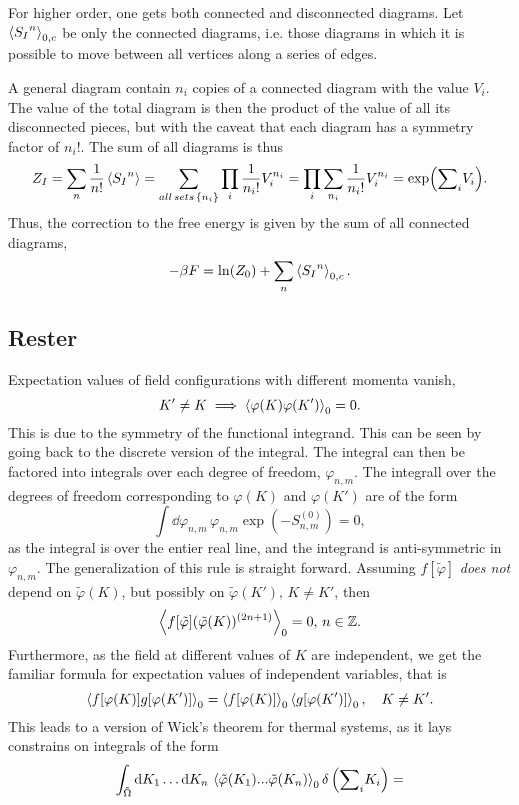 For higher order, one gets both connected and disconnected diagrams.
Let $\ex{{S_I}^n}_{0, c}$ be only the connected diagrams, i.e. those diagrams in which it is possible to move between all vertices along a series of edges.

A general diagram contain $n_i$ copies of a connected diagram with the value $V_i$.
The value of the total diagram is then the product of the value of all its disconnected pieces, but with the caveat that each diagram has a symmetry factor of $n_i!$.
The sum of all diagrams is thus 
\begin{equation}
    Z_I = \sum_n \frac{1}{n!} \ex{{S_I}^n} 
    = \sum_{ all\,sets\,\{n_i\}} \prod_i \frac{1}{n_i!}V_i^{n_i}
    = \prod_i \sum_{n_i} \frac{1}{n_i!}V_i^{n_i} = \exp({\sum}_i V_i).
\end{equation}
Thus, the correction to the free energy is given by the sum of all connected diagrams,
\begin{equation}
    - \beta F = \ln(Z_0) + \sum_n \ex{{S_I}^n}_{0, c}.
\end{equation}

\subsection*{Rester}


Expectation values of field configurations with different momenta vanish,
\begin{equation}
    K' \neq K \implies \ex{\varphi(K) \varphi(K')}_0 = 0.
\end{equation}
This is due to the symmetry of the functional integrand.
This can be seen by going back to the discrete version of the integral.
The integral can then be factored into integrals over each degree of freedom, $\varphi_{n,m}$.
The integrall over the degrees of freedom corresponding to $\varphi(K)$ and $\varphi(K')$ are of the form
\begin{equation}
    \int \dd \varphi_{n, m} \, \varphi_{n, m} \exp(- S^{(0)}_{n, m}) = 0,
\end{equation}
as the integral is over the entier real line, and the integrand is anti-symmetric in $\varphi_{n, m}$.
The generalization of this rule is straight forward. 
Assuming $f[\tilde \varphi]$ \emph{does not} depend on $\tilde \varphi(K)$, but possibly on $\tilde \varphi(K'), \, K \neq K'$, then
\begin{equation}
    \ex{f[\tilde \varphi](\tilde \varphi(K))^{(2n+1)}}_0 = 0, \, n \in \mathbb{Z}.
\end{equation}
Furthermore, as the field at different values of $K$ are independent, we get the familiar formula for expectation values of independent variables, that is
\begin{equation}
    \ex{f[\varphi(K)]g[\varphi(K')]}_0 = \ex{f[\varphi(K)]}_0 \ex{g[\varphi(K')]}_0, \quad
    K \neq K'.
\end{equation}
This leads to a version of Wick's theorem for thermal systems, as it lays constrains on integrals of the form
\begin{equation}
    \int_{\tilde \Omega} \dd K_1 \dots \dd K_n \,
    \ex{\tilde \varphi(K_1) ... \tilde \varphi(K_n)}_0 \delta\left({\sum}_i K_i\right)
    = 
\end{equation}
